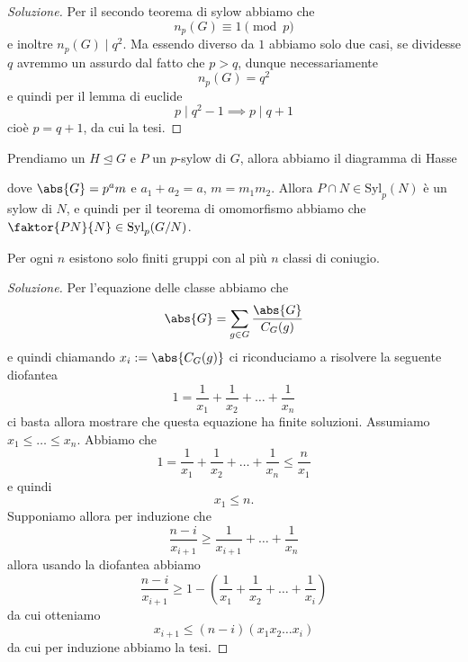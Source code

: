 \documentclass[11pt]{scrartcl}
\newcommand{\normal}{\mathrel{\unlhd}}
\begin{document}
	\begin{proof}[Soluzione]
		Per il secondo teorema di sylow abbiamo che
		$$n_p(G)\equiv 1 \pmod{p}$$
		e inoltre $n_p(G)\mid q^2$. Ma essendo diverso da $1$ abbiamo solo due casi, se dividesse $q$ avremmo un assurdo dal fatto che $p>q$, dunque necessariamente 
		$$n_p(G)=q^2$$
		e quindi per il lemma di euclide
		$$p\mid q^2-1 \implies p\mid q+1$$
		cioè $p=q+1$, da cui la tesi.
	\end{proof}
	\begin{exercise}
		Prendiamo un $H\normal G$ e $P$ un $p$-sylow di $G$, allora abbiamo il diagramma di Hasse
		\begin{center}
		\end{center} 
		dove $\abs{G}=p^am$ e $a_1+a_2=a$, $m=m_1m_2$. Allora $P\cap N\in \text{Syl}_p(N)$ è un sylow di $N$, e quindi per il teorema di omomorfismo abbiamo che $\faktor{PN}{N}\in \text{Syl}_p(G/N)$.
	\end{exercise}
	\begin{exercise}[Landau]
		Per ogni $n$ esistono solo finiti gruppi con al più $n$ classi di coniugio.
	\end{exercise}
	\begin{proof}[Soluzione]
		Per l'equazione delle classe abbiamo che 
		$$\abs{G}=\sum_{g\in G}\frac{\abs{G}}{C_G(g)}$$
		e quindi chiamando $x_i:=\abs{C_G(g)}$ ci riconduciamo a risolvere la seguente diofantea
		$$1=\frac{1}{x_1}+\frac{1}{x_2}+\dots+\frac{1}{x_n}$$
		ci basta allora mostrare che questa equazione ha finite soluzioni. Assumiamo $x_1\le \dots \le x_n$. Abbiamo che
		$$1=\frac{1}{x_1}+\frac{1}{x_2}+\dots+\frac{1}{x_n}\le \frac{n}{x_1}$$
		e quindi 
		$$x_1\le n.$$
		Supponiamo allora per induzione che
		$$\frac{n-i}{x_{i+1}}\ge \frac{1}{x_{i+1}}+\dots+\frac{1}{x_n}$$
		allora usando la diofantea abbiamo
		$$\frac{n-i}{x_{i+1}}\ge 1-\left(\frac{1}{x_1}+\frac{1}{x_2}+\dots+\frac{1}{x_i}\right)$$
		da cui otteniamo
		$$x_{i+1}\le (n-i)(x_1x_2\dots x_i)$$
		da cui per induzione abbiamo la tesi.
	\end{proof}
\end{document}
